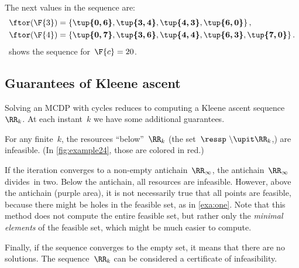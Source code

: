 The next values in the sequence are:
\begin{align*}
	\ftor(\F{3}) & =\left\{ \boldsymbol{\tup{ 0,6} },\boldsymbol{\tup{ 3,4} },\boldsymbol{\tup{ 4,3} },\boldsymbol{\tup{ 6,0} }\right\} ,                          \\
	\ftor(\F{4}) & =\left\{ \boldsymbol{\tup{ 0,7} },\boldsymbol{\tup{ 3,6} },\boldsymbol{\tup{ 4,4} },\boldsymbol{\tup{ 6,3} },\boldsymbol{\tup{ 7,0} }\right\} .
\end{align*}
~shows the sequence for~$\F{c}=20$.

\subsection{Guarantees of Kleene ascent}

Solving an MCDP with cycles reduces to computing a Kleene ascent sequence~$\RR_{k}$.
At each instant~$k$ we have some additional guarantees.

For any finite~$k$, the resources ``below''~$\RR_{k}$ (the set~$\ressp\ \backslash\upit\RR_{k}$,) are infeasible.
(In \cref{fig:example24}, those are colored in red.)

If the iteration converges to a non-empty antichain~$\RR_{\infty}$, the antichain~$\RR_{\infty}$ divides~\ressp in two.
Below the antichain, all resources are infeasible.
However, above the antichain (purple area), it is not necessarily true that all points are feasible, because there might be holes in the feasible set, as in \cref{exa:one}.
Note that this method does not compute the entire feasible set, but rather only the \emph{minimal elements} of the feasible set, which might be much easier to compute.

Finally, if the sequence converges to the empty set, it means that there are no solutions.
The sequence~$\RR_{k}$ can be considered a certificate of infeasibility.
